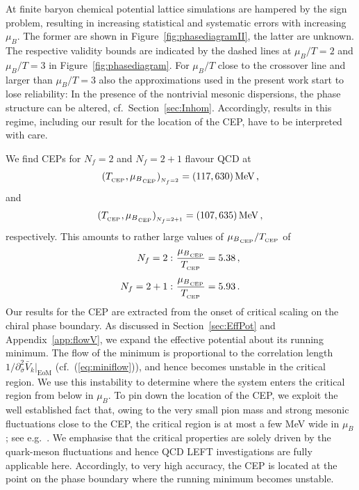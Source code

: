 \documentclass[%
reprint,
superscriptaddress,
showpacs,preprintnumbers,
 amsmath,amssymb,
 aps,
prd,
]{revtex4-1}
\def\Fig#1{Figure~\ref{#1}}
\def\eq#1{(\ref{#1})}
\def\sec#1{Section~\ref{#1}}
\def\app#1{Appendix~\ref{#1}}
\begin{document}
At finite baryon chemical potential lattice simulations are hampered
by the sign problem, resulting in increasing statistical and
systematic errors with increasing $\mu_B$. The former are shown in
\Fig{fig:phasediagramII}, the latter are unknown. The respective
validity bounds are indicated by the dashed lines at $\mu_B/T=2$ and
$\mu_B/T=3$ in \Fig{fig:phasediagram}. For $\mu_B/T$ close to the
crossover line and larger than $\mu_B/T=3$ also the approximations
used in the present work start to lose reliability: In the presence of
the nontrivial mesonic dispersions, the phase structure can be
altered, cf.\ \sec{sec:Inhom}.  Accordingly, results in this regime,
including our result for the location of the CEP, have to be
interpreted with care.

We find CEPs for $N_f=2$ and $N_f=2+1$ flavour QCD at
%
\begin{align}\label{eq:CEP2}
  (T_{_{\tiny{\text{CEP}}}},{\mu_B}_{_{\tiny{\text{CEP}}}})_{_{\tiny{N_f=2}}}
  =(117, 630)\,\textrm{MeV}\,,
\end{align}
%
and
%
\begin{align}\label{eq:CEP2+1}
  (T_{_{\tiny{\text{CEP}}}},{\mu_B}_{_{\tiny{\text{CEP}}}})_{_{\tiny{N_f=2+1}}}
  =(107, 635)\,\textrm{MeV}\,,
\end{align}
respectively. This amounts to rather large values of
${\mu_B}_{_{\tiny{\text{CEP}}}}/T_{_{\tiny{\text{CEP}}}}$ of
%
\begin{align}\nonumber 
  N_f=2:
  &\   \frac{{\mu_B}_{_{\tiny{\text{CEP}}}}}{T_{_{\tiny{\text{CEP}}}}}
    = 5.38\,,\\[1ex]
  N_f=2+1:
  &\  \frac{{\mu_B}_{_{\tiny{\text{CEP}}}}}{T_{_{\tiny{\text{CEP}}}}}
    = 5.93\,. 
\end{align}
%
Our results for the CEP are extracted from the onset of critical
scaling on the chiral phase boundary. As discussed in \sec{sec:EffPot}
and \app{app:flowV}, we expand the effective potential about its
running minimum. The flow of the minimum is proportional to the
correlation length
$1/\partial_{\bar\sigma}^2 \bar V_k\big|_{\textrm{EoM}}$ (cf.\
\eq{eq:miniflow}), and hence becomes unstable in the critical
region. We use this instability to determine where the system enters
the critical region from below in $\mu_B$. To pin down the location of
the CEP, we exploit the well established fact that, owing to the very
small pion mass and strong mesonic fluctuations close to the CEP, the
critical region is at most a few MeV wide in $\mu_B$; see e.g.\
\cite{Herbst:2010rf}. We emphasise that the critical properties are
solely driven by the quark-meson fluctuations and hence QCD LEFT
investigations are fully applicable here. Accordingly, to very high
accuracy, the CEP is located at the point on the phase boundary where
the running minimum becomes unstable.
\end{document}
